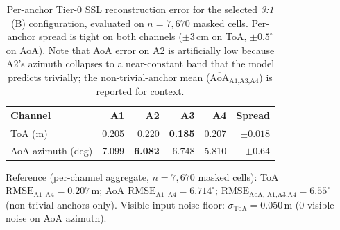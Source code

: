 \begin{table}[t]
\centering
\caption{Per-anchor Tier-0 SSL reconstruction error for the selected
\emph{3:1} (B) configuration, evaluated on $n{=}7{,}670$ masked cells.
Per-anchor spread is tight on both channels ($\pm 3$\,cm on ToA,
$\pm 0.5^\circ$ on AoA). Note that AoA error on A2 is artificially
low because A2's azimuth collapses to a near-constant band that the
model predicts trivially; the non-trivial-anchor mean
($\overline{\text{AoA}}_{\text{A1,A3,A4}}$) is reported for context.}
\label{tab:tier0_peranchor}
\small
\begin{tabular}{l rrrr r}
\toprule
Channel & {A1} & {A2} & {A3} & {A4} & {Spread} \\
\midrule
ToA (m)         & 0.205 & 0.220 & \textbf{0.185} & 0.207 & $\pm 0.018$ \\
AoA azimuth (deg) & 7.099 & \textbf{6.082} & 6.748 & 5.810 & $\pm 0.64$ \\
\bottomrule
\end{tabular}

\smallskip
\noindent
\small Reference (per-channel aggregate, $n{=}7{,}670$ masked cells):
ToA $\overline{\text{RMSE}}_{\text{A1--A4}} = 0.207$\,m;
AoA $\overline{\text{RMSE}}_{\text{A1--A4}} = 6.714^\circ$;
$\overline{\text{RMSE}}_{\text{AoA, A1,A3,A4}} = 6.55^\circ$ (non-trivial
anchors only). Visible-input noise floor: $\sigma_{\text{ToA}} = 0.050$\,m
(0 visible noise on AoA azimuth).
\end{table}
